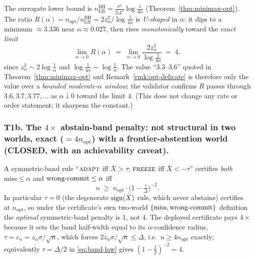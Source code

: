 \begin{remark}\label{rmk:t1a-limit}
The surrogate lower bound is $n_{\mathrm{LB}}^{\mathrm{BH}}=\tfrac{\sigma^2}{2\Delta^2}
\log\tfrac1{4\alpha}$ (Theorem~\ref{thm:minimax-opt}). The ratio
$R(\alpha)=n_{\mathrm{opt}}/n_{\mathrm{LB}}^{\mathrm{BH}}=2z_\alpha^2/\log\tfrac1{4\alpha}$ is
\emph{U-shaped} in $\alpha$: it dips to a minimum $\approx 3.336$ near $\alpha\approx 0.027$,
then rises \emph{monotonically} toward the \emph{exact limit}
\[
   \lim_{\alpha\to0}R(\alpha)
   \;=\;\lim_{\alpha\to0}\frac{2z_\alpha^2}{\log\frac1{4\alpha}}\;=\;4,
\]
since $z_\alpha^2\sim 2\log\tfrac1\alpha$ and $\log\tfrac1{4\alpha}\sim\log\tfrac1\alpha$.
The value ``$3.3$--$3.6$'' quoted in Theorem~\ref{thm:minimax-opt} and
Remark~\ref{rmk:opt-delicate} is therefore only the value over a \emph{bounded moderate-$\alpha$
window}; the validator confirms $R$ passes through $3.6,3.7,3.77,\dots$ as $\alpha\downarrow0$
toward the limit $4$. (This does not change any rate or order statement; it sharpens the
constant.)
\end{remark}

\subsubsection*{T1b. The $4\times$ abstain-band penalty: not structural in two worlds, exact
($=4n_{\mathrm{opt}}$) with a frontier-abstention world (CLOSED, with an achievability caveat).}

\begin{proposition}
\label{prop:t1b-band}
A symmetric-band rule ``$\textsc{adapt}$ iff $\bar X>\tau$; $\textsc{freeze}$ iff
$\bar X<-\tau$'' certifies \emph{both} $\mathrm{miss}\le\alpha$ and $\mathrm{wrong\text-commit}
\le\alpha$ iff
\begin{equation}\label{eq:band-law}
   n\;\ge\;n_{\mathrm{opt}}\cdot\Big(1-\tfrac{\tau}{\Delta}\Big)^{-2}.
\end{equation}
In particular $\tau=0$ (the degenerate $\operatorname{sign}(\bar X)$ rule, which never abstains) certifies at
$n_{\mathrm{opt}}$, so under the certificate's own two-world $\{\mathrm{miss},
\mathrm{wrong\text-commit}\}$ definition the \emph{optimal} symmetric-band penalty is $1$, not
$4$. The deployed certificate pays $4\times$ because it sets the band half-width equal to its
$\alpha$-confidence radius, $\tau=\varepsilon_n=z_\alpha\sigma/\sqrt n$, which forces
$2z_\alpha\sigma/\sqrt n\le\Delta$, i.e.\ $n\ge 4n_{\mathrm{opt}}$ exactly; equivalently
$\tau=\Delta/2$ in \eqref{eq:band-law} gives $(1-\tfrac12)^{-2}=4$.
\end{proposition}

